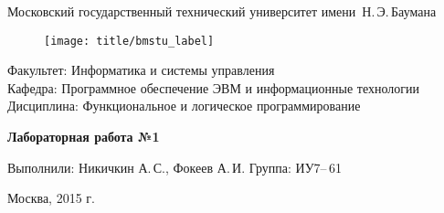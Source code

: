 
\thispagestyle{empty}

\begin{center}
	\Large
	Московский государственный технический университет имени~Н.\,Э.\,Баумана
\end{center}

\begin{figure}[h!]
	\begin{center}
		\texttt{[image: title/bmstu\_label]}
	\end{center}
\end{figure}

\large
\noindent
Факультет: Информатика и системы управления\\[2mm]
\noindent
Кафедра: Программное обеспечение ЭВМ и информационные технологии\\[2mm]
\noindent
Дисциплина: Функциональное и логическое программирование
\vspace{1.5cm}

\begin{center}
	\Large
	\textbf{Лабораторная работа №1}
\end{center}
\vfill

\hfill\begin{minipage}{0.6\textwidth}
	Выполнили: Никичкин А.\,С., Фокеев А.\,И.
	Группа: ИУ7--\,61

\end{minipage}
\vfill

\begin{center}
	Москва, 2015 г.
\end{center}